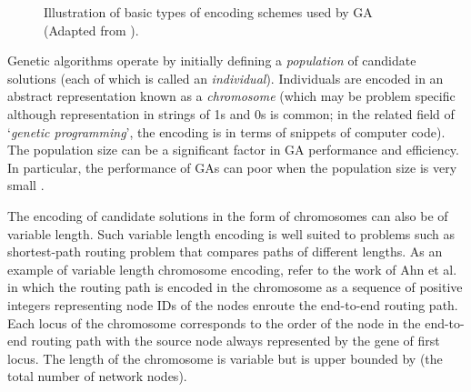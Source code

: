 \documentclass[journal]{IEEEtran}
\begin{document}
\begin{figure}[!ht]
\centering
{}
\caption{Illustration of basic types of encoding schemes used by GA (Adapted from \cite{sivanandam442introduction}).}
\label{fig:encoding}
\end{figure}

Genetic algorithms operate by initially defining a \emph{population} of candidate solutions (each of which is called an \emph{individual}). Individuals are encoded in an abstract representation known as a \emph{chromosome} (which may be problem specific although representation in strings of 1s and 0s is common; in the related field of `\emph{genetic programming}', the encoding is in terms of snippets of computer code). The population size can be a significant factor in GA performance and efficiency. In particular, the performance of GAs can poor when the population size is very small \cite{grefenstette1986optimization}.



The encoding of candidate solutions in the form of chromosomes can also be of variable length. Such variable length encoding is well suited to problems such as shortest-path routing problem that compares paths of different lengths. As an example of variable length chromosome encoding, refer to the work of Ahn et al. \cite{ahn2002genetic} in which the routing path is encoded in the chromosome as a sequence of positive integers representing node IDs of the nodes enroute the end-to-end routing path. Each locus of the chromosome corresponds to the order of the node in the end-to-end routing path with the source node always represented by the gene of first locus. The length of the chromosome is variable but is upper bounded by  (the total number of network nodes).
\end{document}
